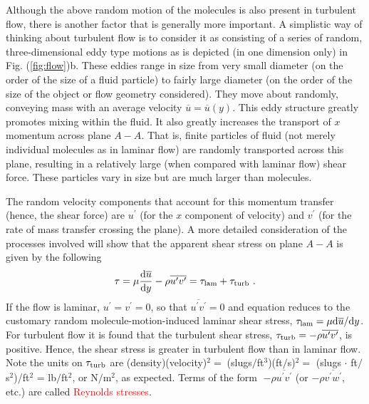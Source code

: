 \documentclass[12pt,a4paper]{article}
\newcommand{\dif}{\mathrm{d}}
\begin{document}
Although the above random motion of the molecules is also present in turbulent flow, there is another factor that is generally more important. A simplistic way of thinking about turbulent flow is to consider it as consisting of a series of random, three-dimensional eddy type motions as is depicted (in one dimension only) in Fig. (\ref{fig:flow})b. These eddies range in size from very small diameter (on the order of the size of a fluid particle) to fairly large diameter (on the order of the size of the object or flow geometry considered). They move about randomly, conveying mass with an average velocity $\overline{u} = \overline{u}(y)$. This eddy structure greatly promotes mixing within the fluid. It also greatly increases the transport of $x$ momentum across plane $A-A$. That is, finite particles of fluid (not merely individual molecules as in laminar flow) are randomly transported across this plane, resulting in a relatively large (when compared with laminar flow) shear force. These particles vary in size but are much larger than molecules.

The random velocity components that account for this momentum transfer (hence, the shear force) are $u^\prime$ (for the $x$ component of velocity) and $v^\prime$ (for the rate of mass transfer crossing the plane). A more detailed consideration of the processes involved will show that the apparent shear stress on plane $A-A$ is given by the following
\begin{equation}
\tau = \mu \dfrac{\dif \overline{u}}{\dif y} - \rho \overline{u^\prime v^\prime} = \tau_{\rm lam} +\tau_{\rm turb} ~.
\end{equation}
If the flow is laminar, $u^\prime = v^\prime = 0$, so that $\overline{u^\prime v^\prime} = 0$ and equation reduces to the customary random molecule-motion-induced laminar shear stress, $\tau_{\rm lam} = \mu \dif \overline{u}/\dif y$. For turbulent flow it is found that the turbulent shear stress, $\tau_{\rm turb} = -\rho \overline{u^\prime v^\prime}$, is positive. Hence, the shear stress is greater in turbulent flow than in laminar flow. Note the units on $\tau_{\rm turb}$ are (density)(velocity)$^2 =􏰔 $(slugs$/$ft$^3$)(ft$/$s)$^2 =$ (slugs $\cdot$ ft$/$s$^2$)/ft$^2$ = lb$/$ft$^2$, or N$/$m$^2$, as expected. Terms of the form 􏰖$-\rho \overline{u^\prime v^\prime}$ (or $-\rho \overline{v^\prime w^\prime}$, etc.) are called \textcolor{red}{Reynolds stresses}.
\end{document}
